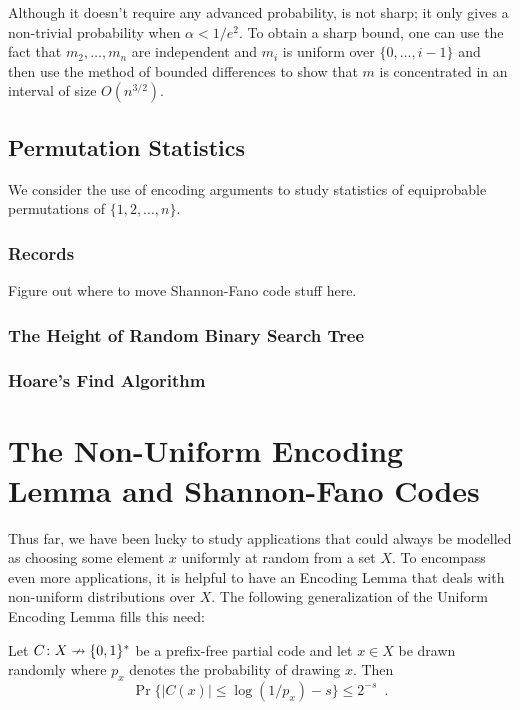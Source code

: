 \documentclass{patmorin}
\begin{document}
\begin{rem}
  Although it doesn't require any advanced probability,
   is not sharp; it only gives a non-trivial
  probability when $\alpha < 1/e^2$.  To obtain a sharp bound, one can
  use the fact that $m_2,\ldots,m_n$ are independent and $m_i$ is uniform
  over $\{0,\ldots,i-1\}$ and then use the method of bounded differences
  \cite{mcdiarmid:on} to show that $m$ is concentrated in an interval
  of size $O(n^{3/2})$.
\end{rem}

\subsection{Permutation Statistics}

We consider the use of encoding arguments to study statistics of
equiprobable permutations of $\{1, 2, \ldots, n\}$.

\subsubsection{Records}

Figure out where to move Shannon-Fano code stuff here.  

\subsubsection{The Height of Random Binary Search Tree}

\subsubsection{Hoare's Find Algorithm}


\section{The Non-Uniform Encoding Lemma and Shannon-Fano Codes}

Thus far, we have been lucky to study applications that could always
be modelled as choosing some element $x$ uniformly at random from a
set $X$. To encompass even more applications, it is helpful to have
an Encoding Lemma that deals with non-uniform distributions over $X$.
The following generalization of the Uniform Encoding Lemma fills this
need:

\begin{lem}  
  Let $C\colon X\nrightarrow\{0,1\}^*$ be a prefix-free partial code and let
  $x\in X$ be drawn randomly where $p_x$ denotes the probability of
  drawing $x$.  Then 
  \[
  \Pr\{ |C(x)| \le \log(1/p_x)-s\} \le 2^{-s} \enspace .
  \]
\end{lem}
\end{document}
